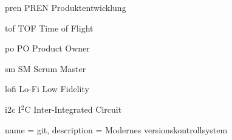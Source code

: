 \newacronym
  {pren}                %
  {PREN}                %
  {Produktentwicklung}  %

\newacronym
  {tof}
  {TOF}
  {Time of Flight}
  
\newacronym
  {po}
  {PO}
  {Product Owner}
  
\newacronym
  {sm}
  {SM}
  {Scrum Master}

\newacronym
  {lofi}
  {Lo-Fi}
  {Low Fidelity}
  
 \newacronym
  {i2c}
  {I$^2$C}
  {Inter-Integrated Circuit}
  

{
  name = git,
  description = {
    Modernes versionskontrollsystem
  }
}